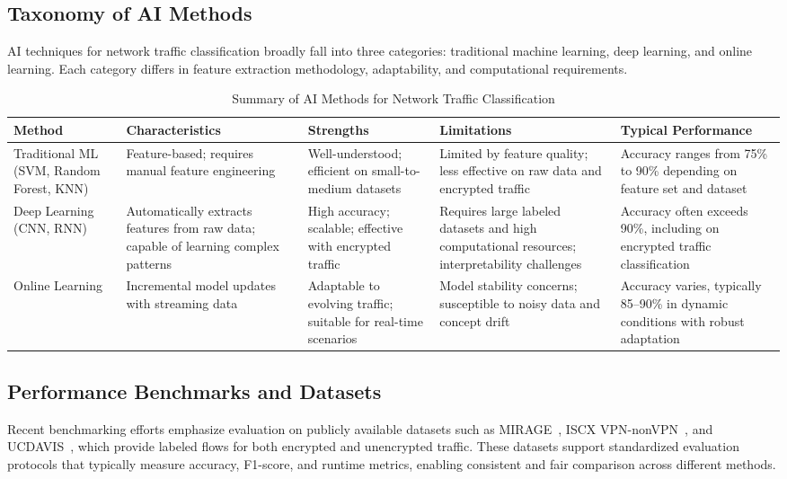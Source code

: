 \documentclass[sigconf]{acmart}
\begin{document}
\subsection{Taxonomy of AI Methods}

AI techniques for network traffic classification broadly fall into three categories: traditional machine learning, deep learning, and online learning. Each category differs in feature extraction methodology, adaptability, and computational requirements.

\begin{table*}[htbp]
\centering
\caption{Summary of AI Methods for Network Traffic Classification}
\label{tab:ai_methods}
\begin{adjustbox}{max width=\textwidth}
\begin{tabular}{@{}lllll@{}}
\toprule
\textbf{Method} & \textbf{Characteristics} & \textbf{Strengths} & \textbf{Limitations} & \textbf{Typical Performance} \\
\midrule
Traditional ML (SVM, Random Forest, KNN) & Feature-based; requires manual feature engineering & Well-understood; efficient on small-to-medium datasets & Limited by feature quality; less effective on raw data and encrypted traffic & Accuracy ranges from 75\% to 90\% depending on feature set and dataset \\
Deep Learning (CNN, RNN) & Automatically extracts features from raw data; capable of learning complex patterns & High accuracy; scalable; effective with encrypted traffic & Requires large labeled datasets and high computational resources; interpretability challenges & Accuracy often exceeds 90\%, including on encrypted traffic classification \\
Online Learning & Incremental model updates with streaming data & Adaptable to evolving traffic; suitable for real-time scenarios & Model stability concerns; susceptible to noisy data and concept drift & Accuracy varies, typically 85--90\% in dynamic conditions with robust adaptation \\
\bottomrule
\end{tabular}
\end{adjustbox}
\end{table*}

\subsection{Performance Benchmarks and Datasets}

Recent benchmarking efforts emphasize evaluation on publicly available datasets such as MIRAGE~\cite{mirage2021dataset}, ISCX VPN-nonVPN~\cite{iscxvpn2016}, and UCDAVIS~\cite{ucdavis2019traffic}, which provide labeled flows for both encrypted and unencrypted traffic. These datasets support standardized evaluation protocols that typically measure accuracy, F1-score, and runtime metrics, enabling consistent and fair comparison across different methods.
\end{document}

